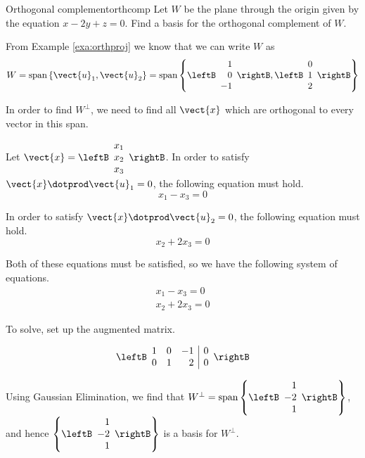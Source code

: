 \begin{example}{Orthogonal complement}{orthcomp}
Let $W$ be the  plane through the origin given by the equation  $x - 2y + z = 0$. Find
a basis for the orthogonal complement of $W$.
\end{example}

\begin{solution}

From Example \ref{exa:orthproj} we know that we can write $W$ as 
\[
W = \mbox{span} \left\{ \vect{u}_1, \vect{u}_2 \right\} = \mbox{span} 
\left\{
\leftB
\begin{array}{r}
1 \\
0 \\
-1
\end{array}
\rightB,
\leftB
\begin{array}{c}
0 \\
1 \\
2
\end{array}
\rightB
\right\}
\]

In order to find $W^{\perp}$, we need to find all $\vect{x}$ which are orthogonal to every vector in this span. 

Let $\vect{x} = \leftB
\begin{array}{c}
x_1 \\
x_2 \\
x_3
\end{array}
\rightB$. 
In order to satisfy $\vect{x} \dotprod \vect{u}_1 = 0$, the following equation must hold. 
\[
x_1 - x_3 = 0
\]

In order to satisfy $\vect{x} \dotprod \vect{u}_2 = 0$, the following equation must hold.
\[
x_2 + 2x_3 = 0 
\]

Both of these equations must be satisfied, so we have the following system of equations. 
\[
\begin{array}{c}
x_1 - x_3 = 0 \\
x_2 + 2x_3 = 0
\end{array}
\]

To solve, set up the augmented matrix. 

\[
\leftB \begin{array}{rrr|r}
1 & 0 & -1 & 0 \\
0 & 1 & 2 & 0 
\end{array} \rightB
\]

Using Gaussian Elimination, we find that $W^{\perp} = \mbox{span} \left\{ \leftB
\begin{array}{r}
1 \\
-2 \\
1
\end{array}
\rightB
\right\}$, and hence 
$\left\{ \leftB
\begin{array}{r}
1 \\
-2 \\
1
\end{array}
\rightB
\right\}$ is a basis for  $W^{\perp}$. 
\end{solution}

